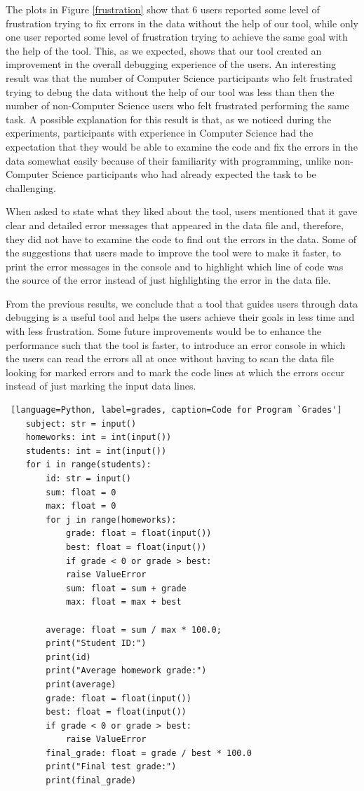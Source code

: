 \documentclass[10pt]{report}
\begin{document}
The plots in Figure \ref{frustration} show that 6 users reported some level of frustration trying to fix errors in the data without the help of our tool, while only one user reported some level of frustration trying to achieve the same goal with the help of the tool. This, as we expected, shows that our tool created an improvement in the overall debugging experience of the users. An interesting result was that the number of Computer Science participants who felt frustrated trying to debug the data without the help of our tool was less than then the number of non-Computer Science users who felt frustrated performing the same task. A possible explanation for this result is that, as we noticed during the experiments, participants with experience in Computer Science had the expectation that they would be able to examine the code and fix the errors in the data somewhat easily because of their familiarity with programming, unlike non-Computer Science participants who had already expected the task to be challenging.

When asked to state what they liked about the tool, users mentioned that it gave clear and detailed error messages that appeared in the data file and, therefore, they did not have to examine the code to find out the errors in the data. Some of the suggestions that users made to improve the tool were to make it faster, to print the error messages in the console and to highlight which line of code was the source of the error instead of just highlighting the error in the data file. 

From the previous results, we conclude that a tool that guides users through data debugging is a useful tool and helps the users achieve their goals in less time and with less frustration. Some future improvements would be to enhance the performance such that the tool is faster, to introduce an error console in which the users can read the errors all at once without having to scan the data file looking for marked errors and to mark the code lines at which the errors occur instead of just marking the input data lines.  

\begin{lstlisting} [language=Python, label=grades, caption=Code for Program `Grades']
	subject: str = input()
	homeworks: int = int(input())
	students: int = int(input())
	for i in range(students):
		id: str = input()
		sum: float = 0
		max: float = 0
		for j in range(homeworks):
			grade: float = float(input())
			best: float = float(input())
			if grade < 0 or grade > best:
			raise ValueError
			sum: float = sum + grade
			max: float = max + best
		
		average: float = sum / max * 100.0;
		print("Student ID:")
		print(id)
		print("Average homework grade:")
		print(average)
		grade: float = float(input())
		best: float = float(input())
		if grade < 0 or grade > best:
			raise ValueError
		final_grade: float = grade / best * 100.0
		print("Final test grade:")
		print(final_grade)
\end{lstlisting}
\end{document}

